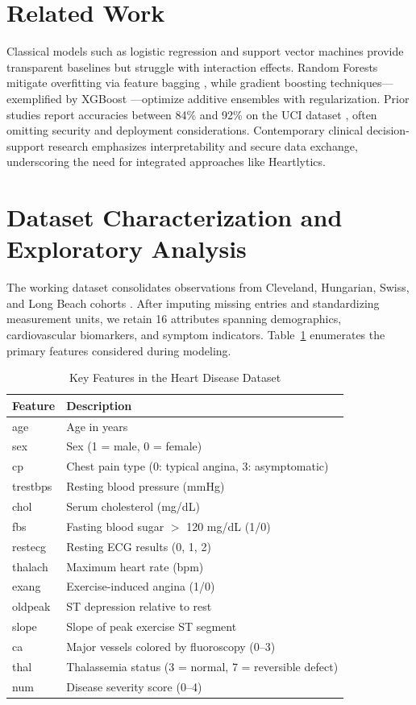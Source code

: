 \documentclass[conference]{IEEEtran}
\begin{document}
\section{Related Work}
Classical models such as logistic regression and support vector machines provide transparent baselines but struggle with interaction effects. Random Forests mitigate overfitting via feature bagging \cite{breiman2001random}, while gradient boosting techniques---exemplified by XGBoost \cite{chen2016xgboost}---optimize additive ensembles with regularization. Prior studies report accuracies between 84\% and 92\% on the UCI dataset \cite{zhang2021heart}, often omitting security and deployment considerations. Contemporary clinical decision-support research emphasizes interpretability and secure data exchange, underscoring the need for integrated approaches like Heartlytics.

\section{Dataset Characterization and Exploratory Analysis}
The working dataset consolidates observations from Cleveland, Hungarian, Swiss, and Long Beach cohorts \cite{janosi1988uci}. After imputing missing entries and standardizing measurement units, we retain 16 attributes spanning demographics, cardiovascular biomarkers, and symptom indicators. Table~\ref{tab:features} enumerates the primary features considered during modeling.

\begin{table}[t]
  \caption{Key Features in the Heart Disease Dataset}
  \label{tab:features}
  \centering
  \begin{tabular}{p{} p{}}
    \toprule
    Feature & Description \\
    \midrule
    age & Age in years \\
    sex & Sex (1 = male, 0 = female) \\
    cp & Chest pain type (0: typical angina, 3: asymptomatic) \\
    trestbps & Resting blood pressure (mmHg) \\
    chol & Serum cholesterol (mg/dL) \\
    fbs & Fasting blood sugar $>$ 120 mg/dL (1/0) \\
    restecg & Resting ECG results (0, 1, 2) \\
    thalach & Maximum heart rate (bpm) \\
    exang & Exercise-induced angina (1/0) \\
    oldpeak & ST depression relative to rest \\
    slope & Slope of peak exercise ST segment \\
    ca & Major vessels colored by fluoroscopy (0--3) \\
    thal & Thalassemia status (3 = normal, 7 = reversible defect) \\
    num & Disease severity score (0--4) \\
    \bottomrule
  \end{tabular}
\end{table}
\end{document}

